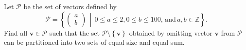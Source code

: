 Let $\mathcal{P}$ be the set of vectors defined by \[\mathcal{P}=\left\{\begin{pmatrix}a\\b\end{pmatrix}\,\middle\vert\,0\leq a\leq 2,0\leq b\leq100,\,\text{and}\,a,b\in\mathbb{Z}\right\}.\] Find all $\mathbf{v}\in\mathcal{P}$ such that the set $\mathcal{P}\setminus\left\{\mathbf{v}\right\}$ obtained by omitting vector $\mathbf{v}$ from $\mathcal{P}$ can be partitioned into two sets of equal size and equal sum.
